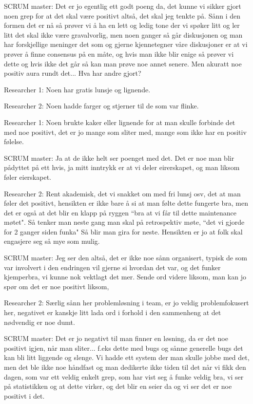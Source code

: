 \documentclass[12pt, a4paper]{report}
\begin{document}
SCRUM master: Det er jo egentlig ett godt poeng da, det kunne vi sikker gjort noen grep for at det skal være positivt altså, det skal jeg tenkte på. Sånn i den formen det er nå så prøver vi å ha en lett og ledig tone der vi spøker litt og ler litt det skal ikke være gravalvorlig, men noen ganger  så går diskusjonen og man har forskjellige meninger det som og gjerne kjennetegner våre diskusjoner er at vi prøver å finne consensus på en måte, og hvis man ikke blir enige så prøver vi dette og hvis ikke det går så kan man prøve noe annet senere. Men akuratt noe positiv aura rundt det... Hva har andre gjort?

Researcher 1: Noen har gratis lunsje og lignende.

Researcher 2: Noen hadde farger og stjerner til de som var flinke.

Researcher 1: Noen brukte kaker eller lignende for at man skulle forbinde det med noe positivt, det er jo mange som sliter med, mange som ikke har en positiv følelse.

SCRUM master: Ja at de ikke helt ser poenget med det. Det er noe man blir pådyttet på ett hvis, ja mitt inntrykk er at vi deler eirerskapet, og man liksom føler eierskapet.

Researcher 2: Rent akademisk, det vi snakket om med fri lunsj osv, det at man føler det positivt, hensikten er ikke bare å si at man følte dette fungerte bra, men det er også at det blir en klapp på ryggen ``bra at vi får til dette maintenance møtet". Så tenker man neste gang man skal på retrospektiv møte, ``det vi gjorde for 2 ganger siden funka" Så blir man gira for neste. Hensikten er jo  at folk skal engasjere seg så mye som mulig.

SCRUM master: Jeg ser den altså, det er ikke noe sånn organisert, typisk de som var involvert i den endringen vil gjerne si hvordan det var, og det funker kjemperbra, vi kunne nok vektlagt det mer. Sende ord videre liksom, man kan jo spør om det er noe positivt liksom,

Researcher 2: Særlig sånn her problemløsning i team, er jo veldig problemfokusert her, negativet  er kanskje litt lada ord i forhold i den sammenheng at det nødvendig er noe dumt.

SCRUM master: Det er jo negativt til man finner en løsning, da er det noe positivt igjen, når man sliter... f.eks dette med bugs og sånne generelle bugs det kan bli litt liggende og slenge. Vi hadde ett system der man skulle jobbe med det, men det ble ikke noe håndfast og man dedikerte ikke tiden til det når vi fikk den dagen, som var ett veldig enkelt grep, som har vist seg å funke veldig bra, vi ser på statistikken og at dette virker, og det blir en seier da og vi ser det er noe positivt i det. 
\end{document}

